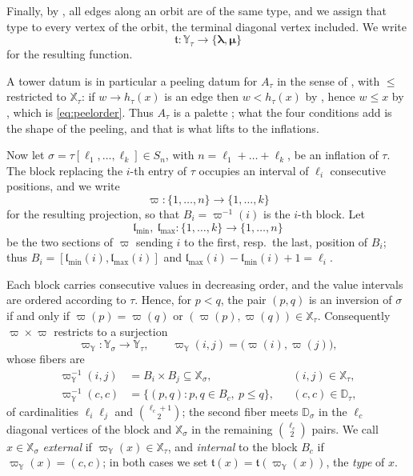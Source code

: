 \documentclass[12pt]{article}
\def\xspace{ }%
\theoremstyle{definition}
\newcommand{\pal}{palette\xspace}      %
\newcommand{\pset}{A}                  %
\newcommand{\typ}{\mathfrak{t}}
\newcommand{\XX}{\mathbb{X}}  %
\newcommand{\YY}{\mathbb{Y}}  %
\newcommand{\DD}{\mathbb{D}}  %
\newcommand{\blam}{\boldsymbol{\lambda}}   %
\newcommand{\bmu}{\boldsymbol{\mu}}        %
\newcommand{\prj}{\varpi}                  %
\newcommand{\prjY}{\varpi_{\YY}}           %
\newcommand{\lmin}{\mathfrak{l}_{\min}}    %
\newcommand{\lmax}{\mathfrak{l}_{\max}}    %
\begin{document}
Finally, by , all edges along an orbit
are of the same type, and we assign that type to every vertex of the
orbit, the terminal diagonal vertex included. We write
\[
   \typ : \YY_\tau \longrightarrow \{\blam,\bmu\}
\]
for the resulting function.

A tower datum is in particular a peeling datum for $\pset_\tau$ in the sense
of , with $\le$ restricted to $\XX_\tau$: if $w \to h_\tau(x)$
is an edge then $w < h_\tau(x)$ by , hence $w \le x$ by
, which is \eqref{eq:peelorder}. Thus $\pset_\tau$ is a
\pal; what the four conditions add is the shape of the peeling, and
that is what lifts to the inflations.

Now let $\sigma = \tau[\ell_1,\dots,\ell_k] \in S_n$, with $n = \ell_1 +
\dots + \ell_k$, be an inflation of $\tau$. The block replacing the $i$-th
entry of $\tau$ occupies an interval of $\ell_i$ consecutive positions,
and we write
\[
   \prj : \{1,\dots,n\} \longrightarrow \{1,\dots,k\}
\]
for the resulting projection, so that $B_i = \prj^{-1}(i)$ is the $i$-th
block. Let
\[
   \lmin,\ \lmax : \{1,\dots,k\} \longrightarrow \{1,\dots,n\}
\]
be the two sections of $\prj$ sending $i$ to the first, resp.\ the
last, position of $B_i$; thus $B_i = [\lmin(i),\lmax(i)]$ and $\lmax(i) -
\lmin(i) + 1 = \ell_i$.

Each block carries consecutive values in decreasing order, and the value
intervals are ordered according to $\tau$. Hence, for $p < q$, the pair
$(p,q)$ is an inversion of $\sigma$ if and only if $\prj(p) = \prj(q)$ or
$(\prj(p),\prj(q)) \in \XX_\tau$. Consequently $\prj\times\prj$ restricts
to a surjection
\[
   \prjY : \YY_\sigma \longrightarrow \YY_\tau,
   \qquad
   \prjY(i,j) = \bigl(\prj(i),\prj(j)\bigr) ,
\]
whose fibers are
\begin{equation}\label{eq:fiber}
\begin{aligned}
   \prjY^{-1}(i,j) &= B_i\times B_j \subseteq \XX_\sigma,
   && (i,j) \in \XX_\tau,\\
   \prjY^{-1}(c,c) &= \{(p,q) : p,q \in B_c,\ p \le q\},
   && (c,c) \in \DD_\tau ,
\end{aligned}
\end{equation}
of cardinalities $\ell_i\ell_j$ and $\binom{\ell_c+1}{2}$; the second
fiber meets $\DD_\sigma$ in the $\ell_c$ diagonal vertices of the block
and $\XX_\sigma$ in the remaining $\binom{\ell_c}{2}$ pairs. We call $x
\in \XX_\sigma$ \emph{external} if $\prjY(x) \in \XX_\tau$, and
\emph{internal} to the block $B_c$ if $\prjY(x) = (c,c)$; in both cases we
set $\typ(x) = \typ(\prjY(x))$, the \emph{type} of $x$.
\end{document}
